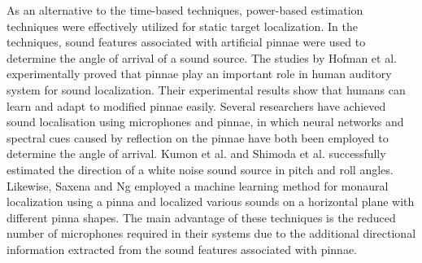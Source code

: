 \documentclass[letterpaper, 10 pt, conference]{ieeeconf}  %
\begin{document}
As an alternative to the time-based techniques, power-based estimation techniques were effectively utilized for static target localization.  In the techniques, sound features associated with artificial pinnae were used to determine the angle of arrival of a sound source.  The studies by Hofman et al.  \cite{hofman1998relearning} experimentally proved that pinnae play an important role in human auditory system for sound localization. Their experimental results show that humans can learn and adapt to modified pinnae easily. Several researchers have achieved sound localisation using microphones and pinnae, in which neural networks \cite{takanishi1993} and spectral cues \cite{kumon2005audio,shimoda2006spectral} caused by reflection on the pinnae have both been employed to determine the angle of arrival. Kumon et al. \cite{kumon2005audio} and Shimoda et al. \cite{shimoda2006spectral} successfully estimated the direction of a white noise sound source in pitch and roll angles. Likewise, Saxena and Ng \cite{saxena2009learning} employed a machine learning method for monaural localization using a pinna and localized various sounds on a horizontal plane with different pinna shapes. The main advantage of these techniques is the reduced number of microphones required in their systems due to the additional directional information extracted from the sound features associated with pinnae. 
\end{document}
